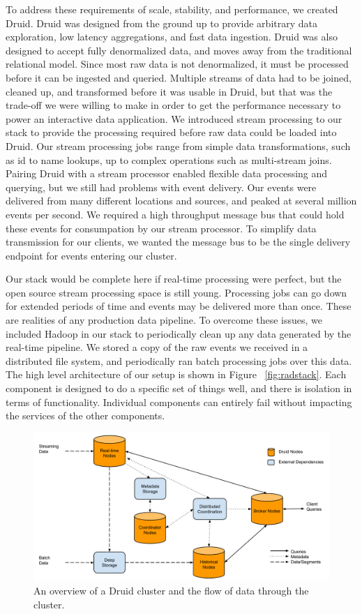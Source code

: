 \documentclass{vldb}
\begin{document}
To address these requirements of scale, stability, and performance, we created
Druid. Druid was designed from the ground up to provide arbitrary data
exploration, low latency aggregations, and fast data ingestion.  Druid was also
designed to accept fully denormalized data, and moves away from the traditional
relational model. Since most raw data is not denormalized, it must be processed
before it can be ingested and queried. Multiple streams of data had to be
joined, cleaned up, and transformed before it was usable in Druid, but that was
the trade-off we were willing to make in order to get the performance necessary
to power an interactive data application. We introduced stream processing to
our stack to provide the processing required before raw data could be loaded
into Druid. Our stream processing jobs range from simple data transformations,
such as id to name lookups, up to complex operations such as multi-stream
joins.  Pairing Druid with a stream processor enabled flexible data processing
and querying, but we still had problems with event delivery.  Our events were
delivered from many different locations and sources, and peaked at several
million events per second. We required a high throughput message bus that could
hold these events for consumpation by our stream processor.  To simplify data
transmission for our clients, we wanted the message bus to be the single
delivery endpoint for events entering our cluster.  

Our stack would be complete here if real-time processing were perfect, but the
open source stream processing space is still young. Processing jobs can go down
for extended periods of time and events may be delivered more than once.  These
are realities of any production data pipeline. To overcome these issues, we
included Hadoop in our stack to periodically clean up any data generated by the
real-time pipeline. We stored a copy of the raw events we received in a
distributed file system, and periodically ran batch processing jobs over this
data. The high level architecture of our setup is shown in Figure
~\ref{fig:radstack}. Each component is designed to do a specific set of things
well, and there is isolation in terms of functionality. Individual components
can entirely fail without impacting the services of the other components.

\begin{figure}
\centering
\includegraphics[width = 4.5in]{cluster}
\caption{An overview of a Druid cluster and the flow of data through the cluster.}
\label{fig:cluster}
\end{figure}
\end{document}
